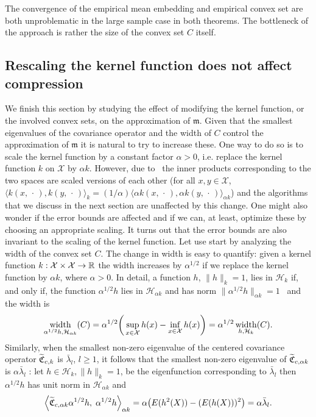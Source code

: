 \documentclass[AHL,Unicode,longabstracts,published]{cedram}
\theoremstyle{remark}
\DeclareMathOperator{\diam}{width}
\newcommand{\R}{\mathbb{R}}
\newcommand{\X}{\mathcal{X}}
\newcommand{\cH}{\mathcal{H}}
\newcommand{\fkC}{\mathfrak{C}}
\newcommand{\Cov}{\tilde{\fkC}}
\newcommand{\mean}{\mathfrak{m}}
\let\oldtilde\tilde
\renewcommand*{\tilde}[1]{\mathchoice{\widetilde{#1}}{\widetilde{#1}}{\oldtilde{#1}}{\oldtilde{#1}}}
\renewcommand*{\to}{\mathchoice{\longrightarrow}{\rightarrow}{\rightarrow}{\rightarrow}}
\let\originalleft\left
\let\originalright\right
\renewcommand{\left}{\mathopen{}\mathclose\bgroup\originalleft}
\renewcommand{\right}{\aftergroup\egroup\originalright}
\begin{document}
The convergence of the empirical mean embedding and empirical convex set are both unproblematic in the large sample case in both theorems. The bottleneck of the approach is rather the size of the convex set $C$ itself.

\subsection{Rescaling the kernel function does not affect compression} We finish this section by studying the effect of modifying the kernel function, or the involved convex sets, on the approximation of $\mean$. Given that the smallest eigenvalues of the covariance operator and the width of $C$ control the approximation of $\mean$ it is natural to try to increase these. One way to do so is to scale the kernel function by a constant factor $\alpha > 0$, i.e. replace the kernel function $k$ on $\X$ by $\alpha k$. However, due to~\cite[Proposition~5.20]{PAUL16} the inner products corresponding to the two spaces are scaled versions of each other (for all $x,y \in \X$, $\langle k(x,\,\cdot\,), k(y,\,\cdot\,) \rangle_k = (1/\alpha) \langle \alpha k(x,\,\cdot\,), \alpha k(y,\,\cdot\,) \rangle_{\alpha k}$) and the algorithms that we discuss in the next section are unaffected by this change. One might also wonder if the error bounds are affected and if we can, at least, optimize these by choosing an appropriate scaling. It turns out that the error bounds are also invariant to the scaling of the kernel function. Let use start by analyzing the width of the convex set $C$. The change in width is easy to quantify: given a kernel function $k: \X \times \X \to \R$ the width increases by $\alpha^{1/2}$ if we replace the kernel function by $\alpha k$, where $\alpha >0$. In detail, a function $h$, $\|h\|_k=1$, lies in $\cH_k$ if, and only if, the function $\alpha^{1/2} h$ lies in $\cH_{\alpha k}$ and has norm $\|\alpha^{1/2} h\|_{\alpha k} = 1$~\cite[Proposition~5.20]{PAUL16} and the width is
\[
\diam_{\alpha^{1/2} h, \cH_{\alpha k}}(C) = \alpha^{1/2}\left(\,\sup_{x \in \X} h(x) - \inf_{x \in \X} h(x)\right) = \alpha^{1/2} \diam_{h, \cH_k}(C).
\]
Similarly, when the smallest non-zero eigenvalue of the centered covariance operator $\Cov_{c,k}$ is $\bar \lambda_l$, $l\geq 1$, it follows that the smallest non-zero eigenvalue of $\Cov_{c,\alpha k}$ is $\alpha \bar \lambda_l$ : let $h \in \cH_k, \|h\|_k=1$, be the eigenfunction corresponding to $\bar \lambda_l$ then $\alpha^{1/2} h$ has unit norm in $\cH_{\alpha k}$ and
\[
\left\langle \Cov_{c,\alpha k} \alpha^{1/2} h,\; \alpha^{1/2} h \right\rangle_{\alpha k} = \alpha \left(E(h^2(X)) - (E(h(X)))^2\right) = \alpha \bar \lambda_l.
\]
\end{document}
